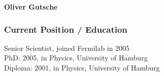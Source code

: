 \documentclass[9pt]{extarticle}
\begin{document}
\pagestyle{empty}


\begin{center}
{\LARGE\bfseries Oliver Gutsche} %
\end{center}




\subsubsection*{Current Position / Education}

Senior Scientist, joined Fermilab in 2005\\
PhD: 2005, in Physics, University of Hamburg\\
Diploma: 2001, in Physics, University of Hamburg





\end{document}
